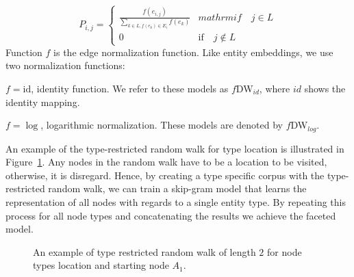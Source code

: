 \begin{equation}
P_{ i,j }=\left\{ 
\begin{matrix}
 \frac { f(e_{ i,j }) }{ \sum _{ k\in L,f(e_{ k })\in E_{ i } }^{  }{ f(e_{ k }) }  }  & mathrm{if}\quad j\in L \\
0 & \mathrm{if}\quad j\notin L
\end{matrix} 
\right. 
\label{eq:transition_type_restricted}
\end{equation} 
\noindent
Function $f$ is the edge normalization function. Like entity embeddings, we use two normalization functions: \\
\begin{inparaenum}
\item  $f=\mathrm{id}$, identity function. We refer to these models as $f$DW$_{id}$, where $id$ shows the identity mapping. \\
\item  $f=\log$, logarithmic normalization. These models are denoted by  $f$DW$_{log}$.\\
\end{inparaenum}
\noindent
An example of the type-restricted random walk for type location is illustrated in Figure~\ref{fig:facetteddeepwalk}. Any nodes in the random walk have to be a location to be visited, otherwise, it is disregard. Hence, by creating a type specific corpus with the type-restricted random walk, we can train a skip-gram model that learns the representation of all nodes with regards to a single entity type. By repeating this process for all node types and concatenating the results we achieve the faceted model.
\begin{figure}
\centering 
\resizebox{0.60\textwidth}{0.27\textwidth}{      

}
\caption{An example of type restricted random walk of length $2$ for node types location and starting node $A_1$.}
\label{fig:facetteddeepwalk}
\end{figure} 
